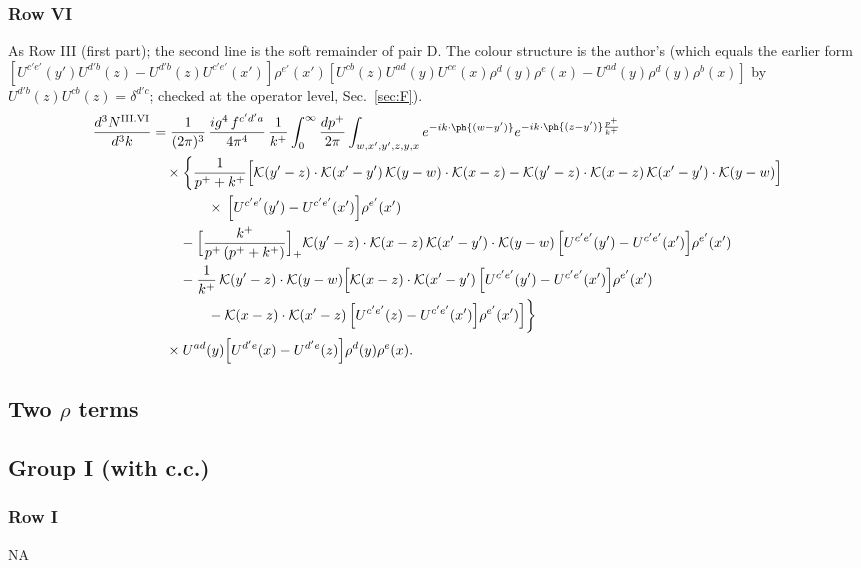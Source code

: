 \subsubsection*{Row VI}
As Row III (first part); the second line is the soft remainder of pair D. The colour structure is the author's (which equals the earlier form $[U^{c'e'}(y')U^{d'b}(z)-U^{d'b}(z)U^{c'e'}(x')]\rho^{e'}(x')[U^{cb}(z)U^{ad}(y)U^{ce}(x)\rho^{d}(y)\rho^{e}(x)-U^{ad}(y)\rho^{d}(y)\rho^{b}(x)]$ by $U^{d'b}(z)U^{cb}(z)=\delta^{d'c}$; checked at the operator level, Sec.~\ref{sec:F}).
\begin{align}
\frac{d^{3}N^{\rm III.VI}}{d^{3}k} & =\frac{1}{(2\pi)^{3}}\,\frac{ig^{4}\,f^{c'd'a}}{4\pi^{4}}\,\frac{1}{k^{+}}\int_{0}^{\infty}\frac{dp^{+}}{2\pi}\int_{w,x',y',z,y,x}e^{-ik\cdot\ph{(w-y')}}e^{-ik\cdot\ph{(z-y')}\frac{p^{+}}{k^{+}}}\notag\\
&\quad\times\bigg\{\frac{1}{p^{+}+k^{+}}\Big[\mathcal{K}(y'-z)\cdot\mathcal{K}(x'-y')\,\mathcal{K}(y-w)\cdot\mathcal{K}(x-z)-\mathcal{K}(y'-z)\cdot\mathcal{K}(x-z)\,\mathcal{K}(x'-y')\cdot\mathcal{K}(y-w)\Big]\notag\\
&\qquad\qquad\times\,\Big[U^{c'e'}(y')-U^{c'e'}(x')\Big]\rho^{e'}(x')\notag\\
&\qquad-\Big[\frac{k^{+}}{p^{+}\,(p^{+}+k^{+})}\Big]_{+}\mathcal{K}(y'-z)\cdot\mathcal{K}(x-z)\,\mathcal{K}(x'-y')\cdot\mathcal{K}(y-w)\,\Big[U^{c'e'}(y')-U^{c'e'}(x')\Big]\rho^{e'}(x')\notag\\
&\qquad-\frac{1}{k^{+}}\,\mathcal{K}(y'-z)\cdot\mathcal{K}(y-w)\Big[\mathcal{K}(x-z)\cdot\mathcal{K}(x'-y')\,\Big[U^{c'e'}(y')-U^{c'e'}(x')\Big]\rho^{e'}(x')\notag\\
&\qquad\qquad-\mathcal{K}(x-z)\cdot\mathcal{K}(x'-z)\,\Big[U^{c'e'}(z)-U^{c'e'}(x')\Big]\rho^{e'}(x')\Big]\bigg\}\notag\\
&\quad\times U^{ad}(y)\Big[U^{d'e}(x)-U^{d'e}(z)\Big]\rho^{d}(y)\rho^{e}(x).\label{eq:B-III6}
\end{align}
\subsection*{Two $\rho$ terms}
\subsection{Group I (with c.c.)}
\subsubsection*{Row I} \textsc{NA}
